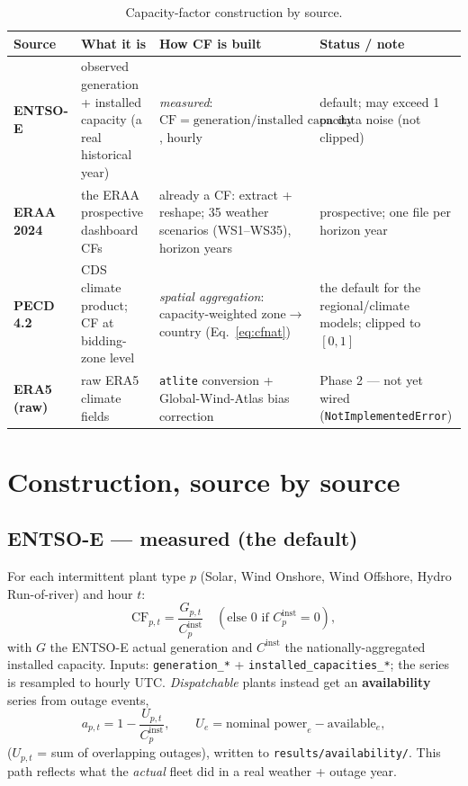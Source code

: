 \documentclass[11pt,a4paper]{article}
\begin{document}
\begin{table}[ht]\centering\caption{Capacity-factor construction by source.}\label{tab:cf}\small
\begin{tabular}{@{}p{2.1cm}p{4.3cm}p{4.6cm}p{3.4cm}@{}}
\toprule
\textbf{Source} & \textbf{What it is} & \textbf{How CF is built} & \textbf{Status / note} \\
\midrule
\textbf{ENTSO-E} & observed generation + installed capacity (a real historical year) &
  \emph{measured}: $\mathrm{CF}=\text{generation}/\text{installed capacity}$, hourly &
  default; may exceed 1 on data noise (not clipped) \\
\textbf{ERAA 2024} & the ERAA prospective dashboard CFs & already a CF: extract + reshape; 35 weather
  scenarios (WS1--WS35), horizon years &
  prospective; one file per horizon year \\
\textbf{PECD 4.2} & CDS climate product; CF at bidding-zone level &
  \emph{spatial aggregation}: capacity-weighted zone$\to$country (Eq.~\ref{eq:cfnat}) &
  the default for the regional/climate models; clipped to $[0,1]$ \\
\textbf{ERA5 (raw)} & raw ERA5 climate fields &
  \texttt{atlite} conversion + Global-Wind-Atlas bias correction &
  Phase 2 --- not yet wired (\texttt{NotImplementedError}) \\
\bottomrule
\end{tabular}
\end{table}

\section{Construction, source by source}

\subsection{ENTSO-E --- measured (the default)}
For each intermittent plant type $p$ (Solar, Wind Onshore, Wind Offshore, Hydro Run-of-river) and hour
$t$:
\begin{equation}
\mathrm{CF}_{p,t}=\frac{G_{p,t}}{C^{\text{inst}}_{p}}\quad(\text{else }0\text{ if }C^{\text{inst}}_p=0),
\label{eq:cfentsoe}
\end{equation}
with $G$ the ENTSO-E actual generation and $C^{\text{inst}}$ the nationally-aggregated installed
capacity. Inputs: \texttt{generation\_*} + \texttt{installed\_capacities\_*}; the series is resampled to
hourly UTC. \emph{Dispatchable} plants instead get an \textbf{availability} series from outage events,
\begin{equation}
a_{p,t}=1-\frac{U_{p,t}}{C^{\text{inst}}_p},\qquad U_e=\text{nominal power}_e-\text{available}_e,
\label{eq:avail}
\end{equation}
($U_{p,t}$ = sum of overlapping outages), written to \texttt{results/availability/}. This path reflects
what the \emph{actual} fleet did in a real weather + outage year.
\end{document}
